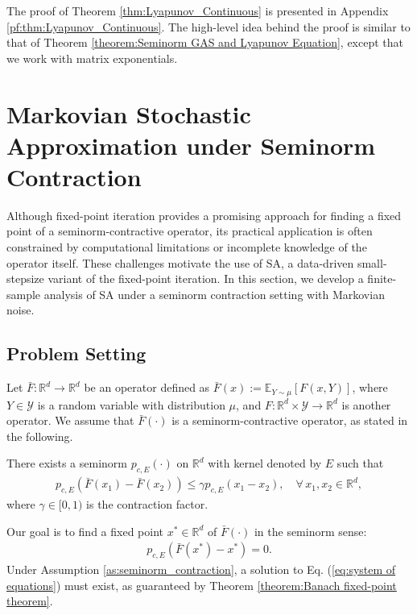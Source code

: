 \documentclass[11 pt]{article}
\begin{document}
	The proof of Theorem \ref{thm:Lyapunov_Continuous} is presented in Appendix \ref{pf:thm:Lyapunov_Continuous}. The high-level idea behind the proof is similar to that of Theorem \ref{theorem:Seminorm GAS and Lyapunov Equation}, except that we work with matrix exponentials.
	
	\section{Markovian Stochastic Approximation under Seminorm Contraction}
	\label{sec:SA}
	Although fixed-point iteration provides a promising approach for finding a fixed point of a seminorm-contractive operator, its practical application is often constrained by computational limitations or incomplete knowledge of the operator itself. These challenges motivate the use of SA, a data-driven small-stepsize variant of the fixed-point iteration. In this section, we develop a finite-sample analysis of SA under a seminorm contraction setting with Markovian noise.
	
	\subsection{Problem Setting}
	Let $\bar{F}:\mathbb{R}^d \to \mathbb{R}^d$ be an operator defined as $\bar{F}(x) := \mathbb{E}_{Y \sim \mu}[F(x, Y)]$, where $Y \in \mathcal{Y}$ is a random variable with distribution $\mu$, and $F:\mathbb{R}^d \times \mathcal{Y} \to \mathbb{R}^d$ is another operator. We assume that $\bar{F}(\cdot)$ is a seminorm-contractive operator, as stated in the following.
	
	\begin{assumption}\label{as:seminorm_contraction}
		There exists a seminorm $p_{c,E}(\cdot)$ on $\mathbb{R}^d$ with kernel denoted by $E$ such that 
		\begin{align*}
			p_{c,E}(\bar{F}(x_1)-\bar{F}(x_2))\leq \gamma p_{c,E}(x_1-x_2),\quad \forall\,x_1,x_2\in\mathbb{R}^d,
		\end{align*}
		where $\gamma \in [0,1)$ is the contraction factor.
	\end{assumption}
	
	Our goal is to find a fixed point $x^* \in \mathbb{R}^d$ of $\bar{F}(\cdot)$ in the seminorm sense:
	\begin{align}\label{eq:system of equations}
		p_{c,E}\left(\bar{F}(x^*) - x^*\right) = 0.
	\end{align}
	Under Assumption \ref{as:seminorm_contraction}, a solution to Eq. (\ref{eq:system of equations}) must exist, as guaranteed by Theorem \ref{theorem:Banach fixed-point theorem}.
	
\end{document}

